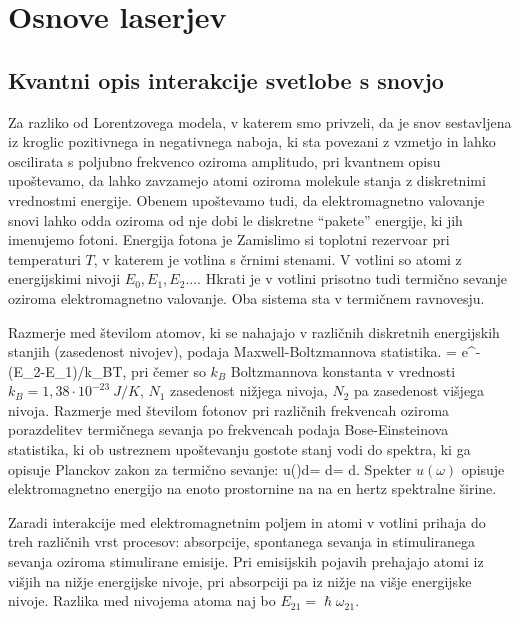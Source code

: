 
\chapter{Osnove laserjev}

\section{Kvantni opis interakcije svetlobe s snovjo}
Za razliko od Lorentzovega modela, v katerem smo privzeli, da je snov sestavljena
iz kroglic pozitivnega in negativnega naboja, ki sta povezani z vzmetjo
in lahko oscilirata s poljubno frekvenco oziroma amplitudo, pri kvantnem
opisu upoštevamo, da lahko zavzamejo atomi oziroma molekule stanja z diskretnimi vrednostmi
energije. Obenem upoštevamo tudi, da elektromagnetno valovanje snovi
lahko odda oziroma od nje dobi le diskretne ``pakete'' energije, ki jih imenujemo
fotoni. Energija fotona je 
Zamislimo si toplotni rezervoar pri temperaturi $T$, v katerem je votlina s črnimi
stenami. V votlini so atomi z energijskimi nivoji $E_0, E_1, E_2...$. Hkrati je 
v votlini prisotno tudi termično sevanje oziroma elektromagnetno valovanje. Oba sistema
sta v termičnem ravnovesju.

Razmerje med številom atomov, ki se nahajajo v različnih  diskretnih energijskih
stanjih (zasedenost nivojev), podaja Maxwell-Boltzmannova statistika. 
\beq
{} = e^{-(E_2-E_1)/k_BT},
\label{eq:11_01}
\eeq
pri čemer so $k_B$ Boltzmannova konstanta v vrednosti $k_B = 1,38 \cdot 10^{-23}~\si{J/K}$, 
$N_1$ zasedenost nižjega nivoja, $N_2$ pa zasedenost višjega nivoja.
Razmerje med številom fotonov pri različnih frekvencah oziroma porazdelitev 
termičnega sevanja po frekvencah podaja Bose-Einsteinova statistika, ki ob 
ustreznem upoštevanju gostote stanj vodi do spektra, ki ga opisuje Planckov zakon
za termično sevanje:
\beq
u(\omega)d\omega = \hslash \omega {} d\omega = 
d\omega.
\label{eq:Planck}
\eeq
Spekter $u(\omega)$ opisuje elektromagnetno energijo na enoto prostornine na na 
en hertz spektralne širine. 

Zaradi interakcije med elektromagnetnim poljem in atomi v votlini prihaja do treh različnih
vrst procesov: absorpcije, spontanega sevanja in stimuliranega sevanja oziroma stimulirane
emisije. Pri emisijskih pojavih prehajajo atomi iz višjih na nižje energijske nivoje, pri 
absorpciji pa iz nižje na višje energijske nivoje. Razlika med nivojema atoma naj bo $E_{21} = 
\hslash \omega_{21}$.

